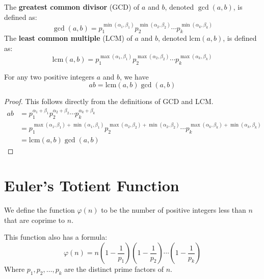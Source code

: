 \documentclass{article}
\theoremstyle{mytheoremstyle}
\theoremstyle{mytheoremstyle}
\theoremstyle{myproblemstyle}
\theoremstyle{myproblemstyle}
\theoremstyle{myproblemstyle}
\begin{document}
    \begin{definition}
        The \textbf{greatest common divisor} (GCD) of $a$ and $b$, denoted $\gcd(a, b)$, is defined as:
        \[
        \gcd(a, b) = p_1^{\min(\alpha_1, \beta_1)} p_2^{\min(\alpha_2, \beta_2)} \cdots p_k^{\min(\alpha_k, \beta_k)}
        \]
        The \textbf{least common multiple} (LCM) of $a$ and $b$, denoted $\mathrm{lcm}(a, b)$, is defined as:
        \[
        \mathrm{lcm}(a, b) = p_1^{\max(\alpha_1, \beta_1)} p_2^{\max(\alpha_2, \beta_2)} \cdots p_k^{\max(\alpha_k, \beta_k)}
        \]
    \end{definition}



    \begin{example}
        For any two positive integers $a$ and $b$, we have $$ab = \mathrm{lcm}(a, b)\gcd(a, b)$$
    \end{example}

    \begin{proof}
        This follows directly from the definitions of GCD and LCM. 
        \begin{align*}
            ab &= p_1^{\alpha_1 + \beta_1} p_2^{\alpha_2 + \beta_2} \cdots p_k^{\alpha_k + \beta_k} \\
            &= p_1^{\max(\alpha_1, \beta_1) + \min(\alpha_1, \beta_1)} p_2^{\max(\alpha_2, \beta_2) + \min(\alpha_2, \beta_2)} \cdots p_k^{\max(\alpha_k, \beta_k) + \min(\alpha_k, \beta_k)}\\
            &= \mathrm{lcm}(a, b) \gcd(a, b)
        \end{align*}
    \end{proof}

    \section{Euler's Totient Function}
    \begin{definition}
        We define the function $\varphi(n)$ to be the number of positive integers less than $n$ that are coprime to $n$.
    \end{definition}

    This function also has a formula:
    \[\varphi(n) = n \left(1 - \frac{1}{p_1}\right)\left(1 - \frac{1}{p_2}\right)\cdots \left(1 - \frac{1}{p_k}\right)\]
    Where $p_1, p_2, \ldots, p_k$ are the distinct prime factors of $n$.

    \vspace{5pt}
\end{document}
